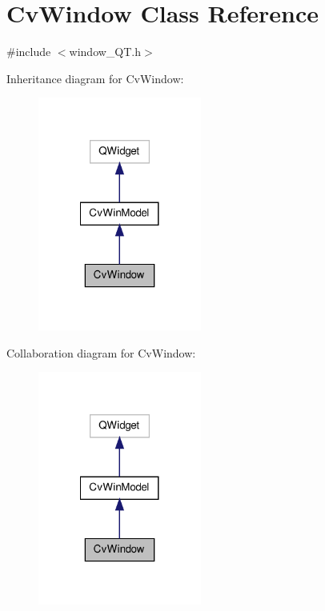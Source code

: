 \hypertarget{classCvWindow}{\section{Cv\-Window Class Reference}
\label{classCvWindow}
}


{\ttfamily \#include $<$window\-\_\-\-Q\-T.\-h$>$}



Inheritance diagram for Cv\-Window\-:
\nopagebreak
\begin{figure}[H]
\begin{center}
\leavevmode
\includegraphics[width=152pt]{classCvWindow__inherit__graph}
\end{center}
\end{figure}


Collaboration diagram for Cv\-Window\-:
\nopagebreak
\begin{figure}[H]
\begin{center}
\leavevmode
\includegraphics[width=152pt]{classCvWindow__coll__graph}
\end{center}
\end{figure}
